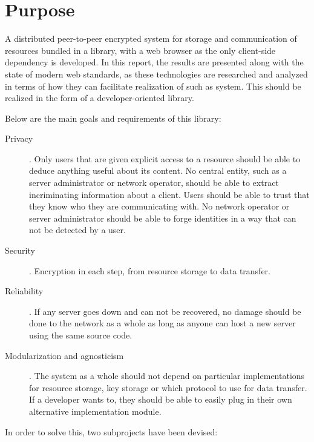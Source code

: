 \section{Purpose}\label{sec:purpose}


A distributed peer-to-peer encrypted system for storage and communication of resources bundled in a library, with a web browser as the only client-side dependency is developed. In this report, the results are presented along with the state of modern web standards, as these technologies are researched and analyzed in terms of how they can facilitate realization of such as system. This should be realized in the form of a developer-oriented library.

Below are the main goals and requirements of this library:

\begin{description}
  \item[Privacy]. Only users that are given explicit access to a resource should be able to deduce anything useful about its content. No central entity, such as a server administrator or network operator, should be able to extract incriminating information about a client. Users should be able to trust that they know who they are communicating with. No network operator or server administrator should be able to forge identities in a way that can not be detected by a user.

\item[Security]. Encryption in each step, from resource storage to data transfer.

\item[Reliability]. If any server goes down and can not be recovered, no damage should be done to the network as a whole as long as anyone can host a new server using the same source code.

\item[Modularization and agnosticism]. The system as a whole should not depend on particular implementations for resource storage, key storage or which protocol to use for data transfer. If a developer wants to, they should be able to easily plug in their own alternative implementation module.

\end{description}

In order to solve this, two subprojects have been devised:

